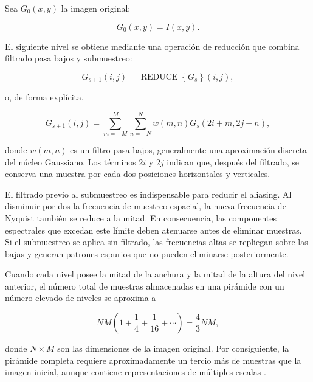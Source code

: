 Sea $G_0(x,y)$ la imagen original:

\begin{equation}
    G_0(x,y)=I(x,y).
    \label{eq:nivel_inicial_gaussiano}
\end{equation}

El siguiente nivel se obtiene mediante una operación de reducción que combina filtrado pasa bajos y submuestreo:

\begin{equation}
    G_{s+1}(i,j)
    =
    \operatorname{REDUCE}
    \left\{
        G_s
    \right\}(i,j),
    \label{eq:reduce_gaussiana}
\end{equation}

o, de forma explícita,

\begin{equation}
    G_{s+1}(i,j)
    =
    \sum_{m=-M}^{M}
    \sum_{n=-N}^{N}
    w(m,n)
    G_s(2i+m,2j+n),
    \label{eq:construccion_piramide_gaussiana}
\end{equation}

donde $w(m,n)$ es un filtro pasa bajos, generalmente una aproximación discreta del núcleo Gaussiano. Los términos $2i$ y $2j$ indican que, después del filtrado, se conserva una muestra por cada dos posiciones horizontales y verticales.

El filtrado previo al submuestreo es indispensable para reducir el \gls{aliasing}. Al disminuir por dos la frecuencia de muestreo espacial, la nueva frecuencia de Nyquist también se reduce a la mitad. En consecuencia, las componentes espectrales que excedan este límite deben atenuarse antes de eliminar muestras. Si el submuestreo se aplica sin filtrado, las frecuencias altas se repliegan sobre las bajas y generan patrones espurios que no pueden eliminarse posteriormente.

Cuando cada nivel posee la mitad de la anchura y la mitad de la altura del nivel anterior, el número total de muestras almacenadas en una pirámide con un número elevado de niveles se aproxima a

\begin{equation}
    NM
    \left(
        1+\frac{1}{4}+\frac{1}{16}+\cdots
    \right)
    =
    \frac{4}{3}NM,
    \label{eq:redundancia_gaussiana}
\end{equation}

donde $N\times M$ son las dimensiones de la imagen original. Por consiguiente, la pirámide completa requiere aproximadamente un tercio más de muestras que la imagen inicial, aunque contiene representaciones de múltiples escalas \cite{ahmed2023overview}.

